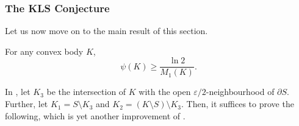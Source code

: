 \subsubsection{The KLS Conjecture}

Let us now move on to the main result of this section.

\begin{ftheo}
	\label{isoperimetric coefficient bound 1}
	For any convex body $K$,
	\[ \psi(K) \geq \frac{\ln 2}{M_1(K)}. \]
\end{ftheo}

In , let $K_3$ be the intersection of $K$ with the open $\varepsilon/2$-neighbourhood of $\partial S$. Further, let $K_1 = S\setminus K_3$ and $K_2 = (K\setminus S)\setminus K_3$. Then, it suffices to prove the following, which is yet another improvement of .

